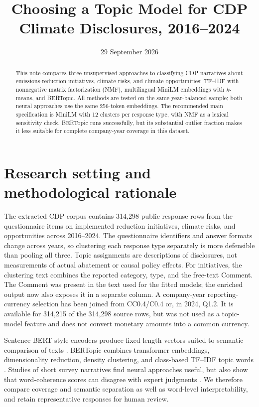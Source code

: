 \documentclass[11pt,a4paper]{article}
\title{Choosing a Topic Model for CDP Climate Disclosures, 2016--2024}
\author{}
\date{29 September 2026}
\begin{document}
\maketitle

\begin{abstract}
This note compares three unsupervised approaches to classifying CDP narratives
about emissions-reduction initiatives, climate risks, and climate opportunities:
TF--IDF with nonnegative matrix factorization (NMF), multilingual MiniLM
embeddings with $k$-means, and BERTopic. All methods are tested on the same
year-balanced sample; both neural approaches use the same 256-token embeddings.
The recommended main specification is MiniLM with 12 clusters per response
type, with NMF as a lexical sensitivity check. BERTopic runs successfully, but
its substantial outlier fraction makes it less suitable for complete
company-year coverage in this dataset.
\end{abstract}

\section{Research setting and methodological rationale}
The extracted CDP corpus contains 314,298 public response rows from the
questionnaire items on implemented reduction initiatives, climate risks, and
opportunities across 2016--2024. The questionnaire identifiers and answer
formats change across years, so clustering each response type separately is
more defensible than pooling all three. Topic assignments are descriptions of
disclosures, not measurements of actual abatement or causal policy effects.
For initiatives, the clustering text combines the reported category, type,
and the free-text Comment. The Comment was present in the text used for
the fitted models; the enriched output now also exposes it in a separate
column. A company-year reporting-currency selection has been joined from
CC0.4/C0.4 or, in 2024, Q1.2. It is available for 314,215 of the
314,298 source rows, but was not used as a topic-model feature and does
not convert monetary amounts into a common currency.

Sentence-BERT-style encoders produce fixed-length vectors suited to semantic
comparison of texts \cite{reimers2019}. BERTopic combines transformer
embeddings, dimensionality reduction, density clustering, and class-based
TF--IDF topic words \cite{grootendorst2022}. Studies of short survey
narratives find neural approaches useful, but also show that word-coherence
scores can disagree with expert judgments \cite{xu2022,hoyle2021}. We
therefore compare coverage and semantic separation as well as word-level
interpretability, and retain representative responses for human review.
\end{document}
